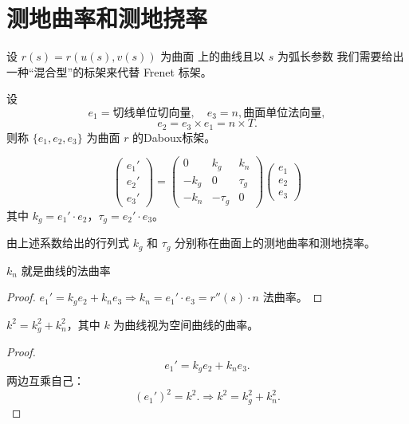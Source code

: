 \documentclass[lang=cn,10pt,thmcnt=section]{elegantbook}
\begin{document}
\section{测地曲率和测地挠率}
设 $r(s) = r(u(s), v(s))$ 为曲面
上的曲线且以 $s$ 为弧长参数
我们需要给出一种“混合型”的标架来代替 Frenet 标架。
\begin{definition}[Daboux标架]
    设
    \[
    e_1 = \text{切线单位切向量}, \quad e_3 = n, \text{曲面单位法向量},
    \]
    \[
    e_2 = e_3 \times e_1 = n \times T.
    \]
    则称 $\{e_1, e_2, e_3\}$ 为曲面 $r$ 的Daboux标架。
\end{definition}
\begin{definition}[Daboux公式]
    \[
\begin{pmatrix}
e_1' \\
e_2' \\
e_3'
\end{pmatrix}
=
\begin{pmatrix}
0 & k_g & k_n \\
-k_g & 0 & \tau_g \\
-k_n & -\tau_g & 0
\end{pmatrix}
\begin{pmatrix}
e_1 \\
e_2 \\
e_3
\end{pmatrix}
\]
其中 $k_g = e_1' \cdot e_2$，$\tau_g = e_2' \cdot e_3$。

由上述系数给出的行列式 $k_g$ 和 $\tau_g$ 分别称在曲面上的测地曲率和测地挠率。
\end{definition}
\begin{proposition}
    $k_n$ 就是曲线的法曲率
\end{proposition}
\begin{proof}
    $e_1' = k_g e_2 + k_n e_3 \Rightarrow k_n = e_1' \cdot e_3 = r''(s) \cdot n$ 法曲率。
\end{proof}

\begin{proposition}
    $k^2 = k_g^2 + k_n^2$，其中 $k$ 为曲线视为空间曲线的曲率。
\end{proposition}
\begin{proof}
    \[
e_1' = k_g e_2 + k_n e_3.
\]
两边互乘自己：
\[
(e_1')^2 = k^2.\Rightarrow k^2 = k_g^2 + k_n^2.
\]
\end{proof}
\end{document}
